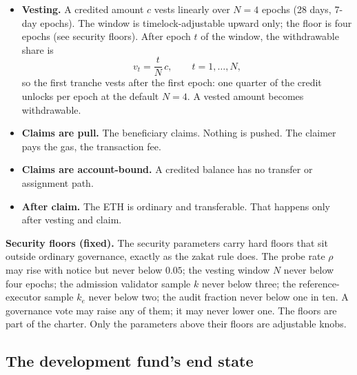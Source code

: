 \documentclass[11pt]{article}
\begin{document}
\begin{itemize}
\item \textbf{Vesting.} A credited amount $c$ vests linearly over
$N=4$ epochs (28 days, 7-day epochs). The window is
timelock-adjustable upward only; the floor is four epochs (see
security floors). After epoch $t$ of the window, the
withdrawable share is
\begin{equation}
v_t = \frac{t}{N} \, c, \qquad t = 1, \ldots, N,
\end{equation}
so the first tranche vests after the first epoch: one quarter
of the credit unlocks per epoch at the default $N=4$. A vested
amount becomes withdrawable.
\item \textbf{Claims are pull.} The beneficiary claims. Nothing
is pushed. The claimer pays the gas, the transaction fee.
\item \textbf{Claims are account-bound.} A credited balance has
no transfer or assignment path.
\item \textbf{After claim.} The ETH is ordinary and transferable.
That happens only after vesting and claim.
\end{itemize}

\textbf{Security floors (fixed).} The security parameters carry
hard floors that sit outside ordinary governance, exactly as the
zakat rule does. The probe rate $\rho$ may rise with notice but
never below $0.05$; the vesting window $N$ never below four
epochs; the admission validator sample $k$ never below three; the
reference-executor sample $k_e$ never below two; the audit
fraction never below one in ten. A governance vote may raise any
of them; it may never lower one. The floors are part of the
charter. Only the parameters above their floors are adjustable
knobs.

\subsection{The development fund's end state}\label{sec:zakat}
\end{document}

